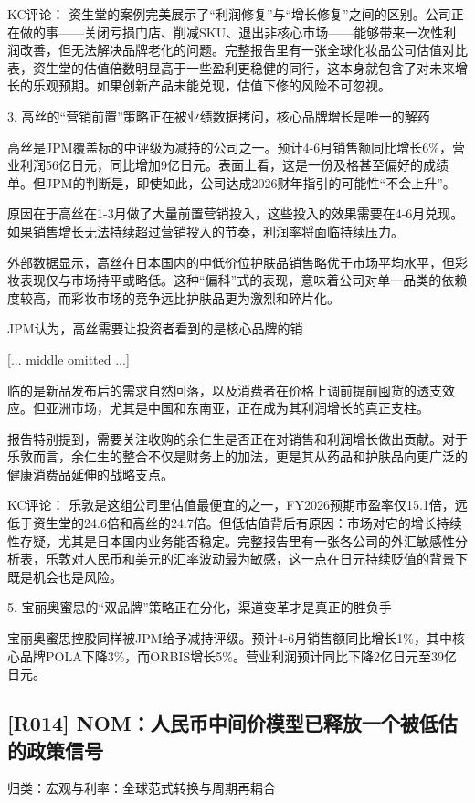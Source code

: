\documentclass[11pt]{ctexart}
\begin{document}
KC评论： 资生堂的案例完美展示了“利润修复”与“增长修复”之间的区别。公司正在做的事——关闭亏损门店、削减SKU、退出非核心市场——能够带来一次性利润改善，但无法解决品牌老化的问题。完整报告里有一张全球化妆品公司估值对比表，资生堂的估值倍数明显高于一些盈利更稳健的同行，这本身就包含了对未来增长的乐观预期。如果创新产品未能兑现，估值下修的风险不可忽视。

3. 高丝的“营销前置”策略正在被业绩数据拷问，核心品牌增长是唯一的解药

高丝是JPM覆盖标的中评级为减持的公司之一。预计4-6月销售额同比增长6\%，营业利润56亿日元，同比增加9亿日元。表面上看，这是一份及格甚至偏好的成绩单。但JPM的判断是，即使如此，公司达成2026财年指引的可能性“不会上升”。

原因在于高丝在1-3月做了大量前置营销投入，这些投入的效果需要在4-6月兑现。如果销售增长无法持续超过营销投入的节奏，利润率将面临持续压力。

外部数据显示，高丝在日本国内的中低价位护肤品销售略优于市场平均水平，但彩妆表现仅与市场持平或略低。这种“偏科”式的表现，意味着公司对单一品类的依赖度较高，而彩妆市场的竞争远比护肤品更为激烈和碎片化。

JPM认为，高丝需要让投资者看到的是核心品牌的销

[... middle omitted ...]

临的是新品发布后的需求自然回落，以及消费者在价格上调前提前囤货的透支效应。但亚洲市场，尤其是中国和东南亚，正在成为其利润增长的真正支柱。

报告特别提到，需要关注收购的余仁生是否正在对销售和利润增长做出贡献。对于乐敦而言，余仁生的整合不仅是财务上的加法，更是其从药品和护肤品向更广泛的健康消费品延伸的战略支点。

KC评论： 乐敦是这组公司里估值最便宜的之一，FY2026预期市盈率仅15.1倍，远低于资生堂的24.6倍和高丝的24.7倍。但低估值背后有原因：市场对它的增长持续性存疑，尤其是日本国内业务能否稳定。完整报告里有一张各公司的外汇敏感性分析表，乐敦对人民币和美元的汇率波动最为敏感，这一点在日元持续贬值的背景下既是机会也是风险。

5. 宝丽奥蜜思的“双品牌”策略正在分化，渠道变革才是真正的胜负手

宝丽奥蜜思控股同样被JPM给予减持评级。预计4-6月销售额同比增长1\%，其中核心品牌POLA下降3\%，而ORBIS增长5\%。营业利润预计同比下降2亿日元至39亿日元。

\subsection{[R014] NOM：人民币中间价模型已释放一个被低估的政策信号}
{\small\color{refgray}归类：宏观与利率：全球范式转换与周期再耦合}
\end{document}
